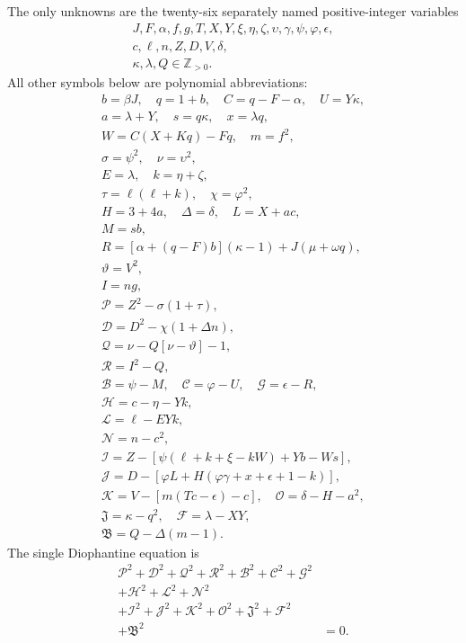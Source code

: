 The only unknowns are the twenty-six separately named positive-integer variables
\[
\begin{gathered}J,F,\alpha,f,g,T,X,Y,\xi,\eta,\zeta,\upsilon,\gamma,\psi,\varphi,\epsilon,\\
c,\ell,n,Z,D,V,\delta,\\
\kappa,\lambda,Q\in\mathbb Z_{>0}.\end{gathered}
\]
All other symbols below are polynomial abbreviations:
\[
\begin{gathered}
b=\beta J,\quad q=1+b,\quad C=q-F-\alpha,\quad U=Y\kappa,\\
a=\lambda+Y,\quad s=q\kappa,\quad x=\lambda q,\\
W=C(X+Kq)-Fq,\quad m=f^2,\\
\sigma=\psi^2,\quad\nu=\upsilon^2,\\
E=\lambda,\quad k=\eta+\zeta,\\
\tau=\ell(\ell+k),\quad\chi=\varphi^2,\\
H=3+4a,\quad\Delta=\delta,\quad L=X+ac,\\
M=sb,\\
R=[\alpha+(q-F)b](\kappa-1)+J(\mu+\omega q),\\
\vartheta=V^2,\\
I=ng,\\
\mathcal{P}=Z^2-\sigma(1+\tau),\\
\mathcal{D}=D^2-\chi(1+\Delta n),\\
\mathcal{Q}=\nu-Q[\nu-\vartheta]-1,\\
\mathcal{R}=I^2-Q,\\
\mathcal{B}=\psi-M,\quad \mathcal{C}=\varphi-U,\quad \mathcal{G}=\epsilon-R,\\
\mathcal{H}=c-\eta-Yk,\\
\mathcal{L}=\ell-EYk,\\
\mathcal{N}=n-c^2,\\
\mathcal{I}=Z-[\psi(\ell+k+\xi-kW)+Yb-Ws],\\
\mathcal{J}=D-[\varphi L+H(\varphi\gamma+x+\epsilon+1-k)],\\
\mathcal{K}=V-[m(Tc-\epsilon)-c],\quad\mathcal{O}=\delta-H-a^2,\\
\mathfrak{J}=\kappa-q^2,\quad\mathcal{F}=\lambda-XY,\\
\mathfrak{B}=Q-\Delta(m-1).
\end{gathered}
\]
The single Diophantine equation is
\[
\begin{split}
\mathcal{P}^2+\mathcal{D}^2+\mathcal{Q}^2+\mathcal{R}^2+\mathcal{B}^2+\mathcal{C}^2+\mathcal{G}^2 &\\
+\mathcal{H}^2+\mathcal{L}^2+\mathcal{N}^2 &\\
+\mathcal{I}^2+\mathcal{J}^2+\mathcal{K}^2+\mathcal{O}^2+\mathfrak{J}^2+\mathcal{F}^2 &\\
+\mathfrak{B}^2 &= 0.
\end{split}
\]

